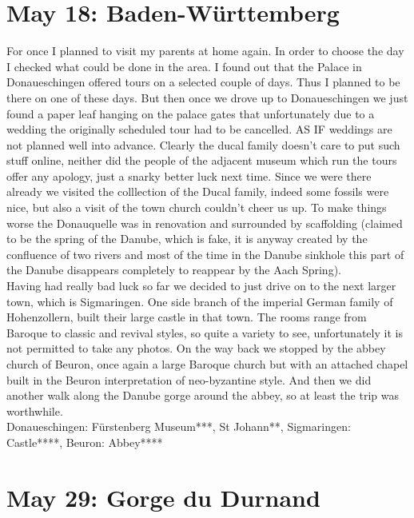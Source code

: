 \section{May 18: Baden-W\"urttemberg}
\label{Donaueschingen2014}

For once I planned to visit my parents at home again. In order to choose the day I checked what could be done in the area. I found out that the Palace in Donaueschingen offered tours on a selected couple of days. Thus I planned to be there on one of these days. But then once we drove up to Donaueschingen we just found a paper leaf hanging on the palace gates that unfortunately due to a wedding the originally scheduled tour had to be cancelled. AS IF weddings are not planned well into advance. Clearly the ducal family doesn't care to put such stuff online, neither did the people of the adjacent museum which run the tours offer any apology, just a snarky better luck next time. Since we were there already we visited the colllection of the Ducal family, indeed some fossils were nice, but also a visit of the town church couldn't cheer us up. To make things worse the Donauquelle was in renovation and surrounded by scaffolding (claimed to be the spring of the Danube, which is fake, it is anyway created by the confluence of two rivers and most of the time in the Danube sinkhole this part of the Danube disappears completely to reappear by the Aach Spring). \\
Having had really bad luck so far we decided to just drive on to the next larger town, which is Sigmaringen. One side branch of the imperial German family of Hohenzollern, built their large castle in that town. The rooms range from Baroque to classic and revival styles, so quite a variety to see, unfortunately it is not permitted to take any photos. On the way back we stopped by the abbey church of Beuron, once again a large Baroque church but with an attached chapel built in the Beuron interpretation of neo-byzantine style. And then we did another walk along the Danube gorge around the abbey, so at least the trip was worthwhile.\\

Donaueschingen: F\"urstenberg Museum***, St Johann**, Sigmaringen: Castle****, Beuron: Abbey****

\section{May 29: Gorge du Durnand}
\label{Durnand2014}

